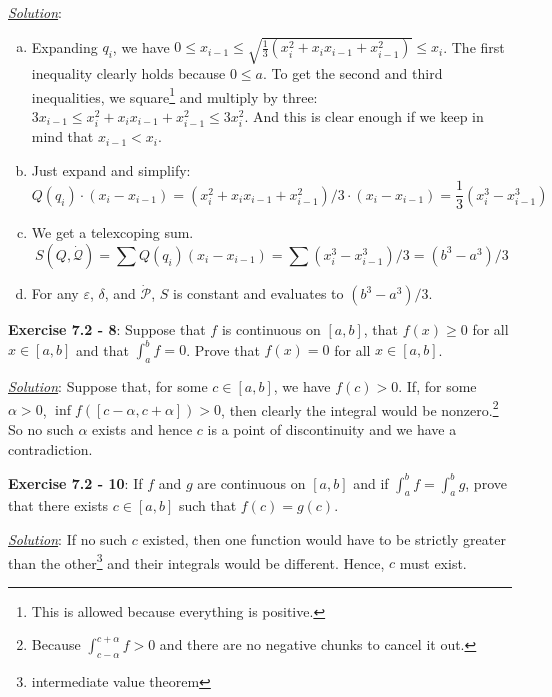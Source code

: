 \documentclass{article}
\newcommand{\Pdot}{\dot{\mathcal P}}
\begin{document}
\underline{\textit{Solution}}:

\begin{enumerate}[(a)]
  \item Expanding $q_i$, we have $0 \leq x_{i-1}
    \leq \sqrt{\frac{1}{3} (x_i^2 + x_i x_{i-1} + x_{i-1}^2)} \leq x_i$.
    The first inequality clearly holds because $0 \leq a$. To get the
    second and third inequalities, we square\footnote{This is allowed
    because everything is positive.} and multiply by three:
    $3 x_{i-1} \leq x_i^2 + x_i x_{i-1} + x_{i-1}^2 \leq 3x_i^2$.
    And this is clear enough if we keep in mind that $x_{i-1} < x_i$.
  \item Just expand and simplify:
    \[
      Q(q_i) \cdot (x_i - x_{i-1})
      = (x_i^2 + x_i x_{i-1} + x_{i-1}^2) / 3 \cdot (x_i - x_{i-1})
      = \frac{1}{3} (x_i^3 - x_{i-1}^3)
    \]
  \item We get a telexcoping sum.
    \[
      S(Q, \dot{\mathcal Q})
      = \sum Q(q_i) (x_i - x_{i-1})
      = \sum (x_i^3 - x_{i-1}^3)/3
      = (b^3 - a^3)/3
    \]
  \item For any $\varepsilon$, $\delta$, and $\Pdot$, $S$ is constant and
    evaluates to $(b^3 - a^3)/3$.
\end{enumerate}

\hrulefill

\textbf{Exercise 7.2 - 8}:
Suppose that $f$ is continuous on $[a, b]$, that $f(x) \geq 0$ for all
$x \in [a, b]$ and that $\int_a^b f = 0$. Prove that $f(x) = 0$ for all
$x \in [a, b]$.

\underline{\textit{Solution}}:
Suppose that, for some $c \in [a, b]$, we have $f(c) > 0$. If, for some
$\alpha > 0$, $\inf f([c-\alpha, c+\alpha]) > 0$, then clearly the integral
would be nonzero.\footnote{Because $\int_{c-\alpha}^{c+\alpha} f > 0$ and
there are no negative chunks to cancel it out.}
So no such $\alpha$ exists and hence $c$ is a point of discontinuity and we
have a contradiction.

\hrulefill

\textbf{Exercise 7.2 - 10}:
If $f$ and $g$ are continuous on $[a, b]$ and if $\int_a^b f = \int_a^b g$,
prove that there exists $c \in [a, b]$ such that $f(c) = g(c)$.

\underline{\textit{Solution}}:
If no such $c$ existed, then one function would have to be strictly greater
than the other\footnote{intermediate value theorem} and their integrals
would be different. Hence, $c$ must exist.

\hrulefill
\end{document}
